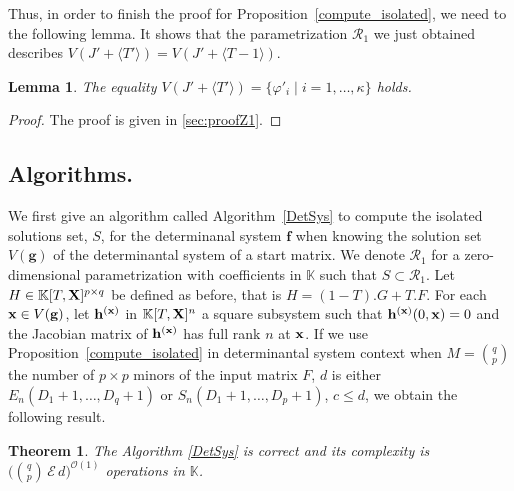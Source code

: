 \documentclass[11pt]{article}
\numberwithin{Property}{section}
\newtheorem{Theorem}{Theorem}%
\numberwithin{Theorem}{section}
\numberwithin{Proposition}{section}
\newtheorem{Lemma}{Lemma}%
\numberwithin{Lemma}{section}
\numberwithin{Corollary}{section}
\numberwithin{Definition}{section}
\numberwithin{Remark}{section}
\numberwithin{Conjecture}{section}
\numberwithin{Problem}{section}
\numberwithin{Claim}{section}
\theoremstyle{definition}
\numberwithin{Example}{section}
\def\f {\ensuremath{\mathbf{f}}}
\def\h {\ensuremath{\mathbf{h}}}
\def\g {\ensuremath{\mathbf{g}}}
\renewcommand{\leq}{\leqslant}
\newcommand{\bigO}[1]{\mathcal{O}(#1)} %
\newcommand{\field}{\mathbb{K}} %
\newcommand{\mat}[1]{\mathbf{\MakeUppercase{#1}}} %
\newcommand{\improve}[1]{\textcolor{blue}{#1}} %
\begin{document}
Thus, in order to finish the proof for Proposition~\ref{compute_isolated}, we need to the following lemma. It shows that the parametrization $\mathscr{R}_1$ we just obtained  describes $V(J' + \langle T' \rangle)=V(J' + \langle T-1 \rangle)$.

\begin{Lemma}\label{lemma:Z1}
  The equality $V(J' +\langle T' \rangle)=\{\varphi'_i \mid i=1,\dots,\kappa\}$ holds.
\end{Lemma}
\begin{proof}
The proof is given in \improve{\cref{sec:proofZ1}}. 
\end{proof}

\subsection{Algorithms.} We first give an algorithm called Algorithm~\ref{DetSys} to compute the isolated solutions set, $S$,  for the determinanal system $\f$ when knowing the solution set $V(\g)$ of the determinantal system of a start matrix. We denote $\mathscr{R}_{1}$ for a zero-dimensional parametrization with coefficients in $\field$ such that $S \subset \mathscr{R}_{1}$. Let $H \in \field[T, \mat{X}]^{p \times q}$ be defined as before, that is $H = (1 - T).G + T.F$. For each ${\bf x} \in V(\g)$, let $\h^{(\bf x)}$ in $\field[T,\mat{X}]^n$ a square subsystem such that $\h^{(\bf x)}(0,{\bf x}) = 0$ and the Jacobian matrix of $\h^{(\bf x)}$ has full rank $n$ at ${\bf x}$. If we use Proposition~\ref{compute_isolated} in determinantal system context when $M = {{q}\choose{p}}$ the number of $p \times p$ minors of the input matrix $F$, $d$ is either $E_n(D_1+1, \ldots, D_q+1)$ or $S_n(D_1+1, \ldots, D_p+1)$, $c \leq d$, we obtain the following result. 
\begin{Theorem}
The Algorithm \ref{DetSys} is correct and its complexity is $\big({{q}\choose{p}} \,\mathcal{E}\,d\big)^{\bigO{1}}$ operations in $\field$.
\end{Theorem}
\end{document}
